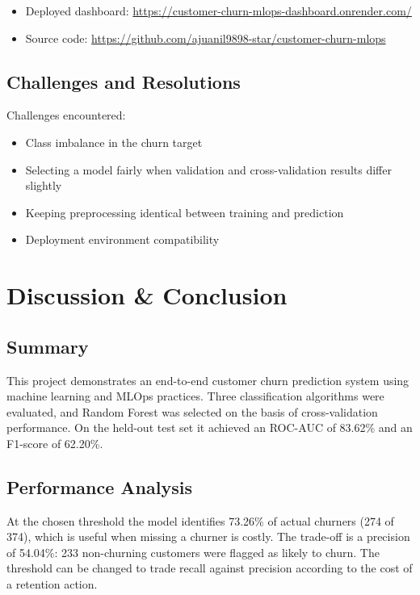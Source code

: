 \documentclass[12pt,a4paper]{report}
\begin{document}
\begin{itemize}
\item Deployed dashboard: \url{https://customer-churn-mlops-dashboard.onrender.com/}
\item Source code: \url{https://github.com/ajuanil9898-star/customer-churn-mlops}
\end{itemize}

\section{Challenges and Resolutions}

Challenges encountered:

\begin{itemize}
\item Class imbalance in the churn target
\item Selecting a model fairly when validation and cross-validation results differ slightly
\item Keeping preprocessing identical between training and prediction
\item Deployment environment compatibility
\end{itemize}

\chapter{Discussion \& Conclusion}

\section{Summary}

This project demonstrates an end-to-end customer churn prediction system using machine learning and MLOps practices. Three classification algorithms were evaluated, and Random Forest was selected on the basis of cross-validation performance. On the held-out test set it achieved an ROC-AUC of 83.62\% and an F1-score of 62.20\%.

\section{Performance Analysis}

At the chosen threshold the model identifies 73.26\% of actual churners (274 of 374), which is useful when missing a churner is costly. The trade-off is a precision of 54.04\%: 233 non-churning customers were flagged as likely to churn. The threshold can be changed to trade recall against precision according to the cost of a retention action.
\end{document}
